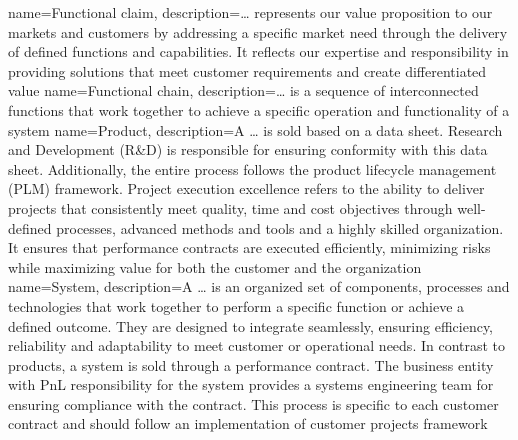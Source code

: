 %
%
{%
	name=Functional claim,%
	description={\dots{} represents our value proposition to our markets and customers by addressing a specific market need through the delivery of defined functions and capabilities. It reflects our expertise and responsibility in providing solutions that meet customer requirements and create differentiated value}%
}
%
{%
	name=Functional chain,%
	description={\dots{} is a sequence of interconnected functions that work  together to achieve a specific operation and functionality of a system}%
}
%
{%
	name=Product,%
	description={A \dots{} is sold based on a data sheet. %
			Research and Development (R\&D) is responsible for ensuring conformity with this data sheet. %
			Additionally, the entire process follows the product lifecycle management (PLM) framework. %
			Project execution excellence refers to the ability to deliver projects that consistently meet quality, %
			time and cost objectives through well-defined processes, advanced methods and tools and a highly skilled organization. %
			It ensures that performance contracts are executed efficiently, %
			minimizing risks while maximizing value for both the customer and the organization}%
}
%
{%
	name=System,%
	description={A \dots{} is an organized set of components, processes and technologies that work together to perform a specific function or achieve a defined outcome. %
			They are designed to integrate seamlessly, ensuring efficiency, reliability and adaptability to meet customer or operational needs. %
			In contrast to products, a system is sold through a performance contract. %
			The business entity with PnL responsibility for the system provides a systems engineering team for ensuring compliance with the contract. %
			This process is specific to each customer contract and should follow an implementation of customer projects framework}%
}
